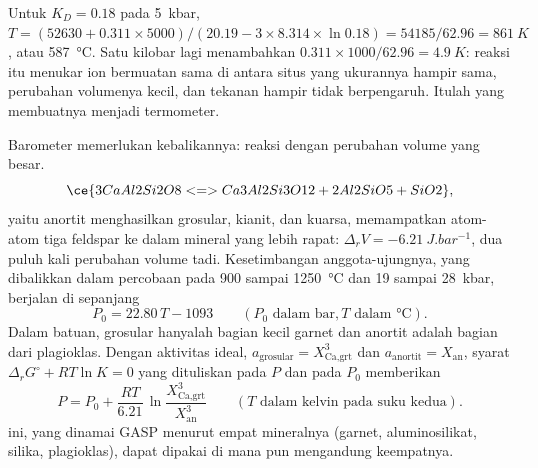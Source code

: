 \begin{omfigure}
\centering
{}
\par{}
\end{omfigure}

Untuk $K_D = 0.18$ pada \qty{5}{kbar}, $T = (52630 + 0.311\times5000)/(20.19 - 3\times8.314
\times\ln 0.18) = 54185/62.96 = \qty{861}{K}$, atau \qty{587}{\celsius}. Satu kilobar lagi
menambahkan $0.311\times1000/62.96 = \qty{4.9}{K}$: reaksi itu menukar ion bermuatan sama
di antara situs yang ukurannya hampir sama, perubahan volumenya kecil, dan tekanan hampir tidak
berpengaruh. Itulah yang membuatnya menjadi termometer.

Barometer memerlukan kebalikannya: reaksi dengan perubahan volume yang besar. 
\[
\ce{3 CaAl2Si2O8 <=> Ca3Al2Si3O12 + 2 Al2SiO5 + SiO2},
\]
yaitu anortit menghasilkan grosular, kianit, dan kuarsa, memampatkan atom-atom tiga feldspar ke dalam
mineral yang lebih rapat: $\Delta_r V = \qty{-6.21}{J.bar^{-1}}$, dua puluh kali perubahan volume  tadi.
Kesetimbangan anggota-ujungnya, yang dibalikkan dalam percobaan pada 900 sampai \qty{1250}{\celsius} dan 19
sampai \qty{28}{kbar}, berjalan di sepanjang
\[
P_0 = 22.80\,T - 1093 \qquad (P_0 \text{ dalam bar}, T \text{ dalam } \unit{\celsius}).
\]
Dalam batuan, grosular hanyalah bagian kecil garnet dan anortit adalah bagian dari
plagioklas. Dengan aktivitas ideal, $a_{\text{grosular}} = X_{\text{Ca,grt}}^3$ dan
$a_{\text{anortit}} = X_{\text{an}}$, syarat $\Delta_r G^\circ + RT\ln K = 0$
yang dituliskan pada $P$ dan pada $P_0$ memberikan
\[
P = P_0 + \frac{RT}{6.21}\,\ln\frac{X_{\text{Ca,grt}}^3}{X_{\text{an}}^3}
\qquad (T \text{ dalam kelvin pada suku kedua}).
\]
 ini, yang dinamai GASP menurut empat mineralnya (garnet, aluminosilikat, silika,
plagioklas), dapat dipakai di mana pun  mengandung keempatnya.

